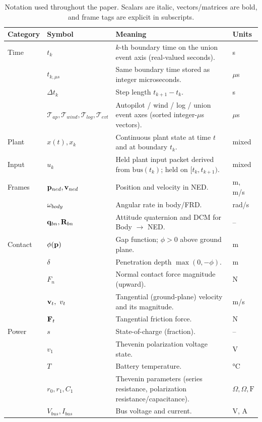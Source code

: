 \begin{table}[t]
  \centering
  \small
  \begin{tabularx}{\linewidth}{@{}l l X l@{}}
    \toprule
    Category & Symbol & Meaning & Units \\
    \midrule
    Time & $t_k$ & $k$-th boundary time on the union event axis (real-valued seconds). & s \\
         & $t_{k,\mu s}$ & Same boundary time stored as integer microseconds. & $\mu$s \\
         & $\Delta t_k$ & Step length $t_{k+1}-t_k$. & s \\
         & $\mathcal{T}_{ap},\mathcal{T}_{wind},\mathcal{T}_{log},\mathcal{T}_{evt}$ & Autopilot / wind / log / union event axes (sorted integer-$\mu$s vectors). & $\mu$s \\
    Plant & $x(t),x_k$ & Continuous plant state at time $t$ and at boundary $t_k$. & mixed \\
    Input & $u_k$ & Held plant input packet derived from $\mathrm{bus}(t_k)$; held on $[t_k,t_{k+1})$. & mixed \\
    Frames & $\mathbf{p}_{ned},\mathbf{v}_{ned}$ & Position and velocity in NED. & m, m/s \\
           & $\mathbf{\omega}_{body}$ & Angular rate in body/FRD. & rad/s \\
           & $\mathbf{q}_{bn},\mathbf{R}_{bn}$ & Attitude quaternion and DCM for Body $\to$ NED. & -- \\
    Contact & $\phi(\mathbf{p})$ & Gap function; $\phi>0$ above ground plane. & m \\
            & $\delta$ & Penetration depth $\max(0,-\phi)$. & m \\
            & $F_n$ & Normal contact force magnitude (upward). & N \\
            & $\vect{v}_t,\ v_t$ & Tangential (ground-plane) velocity and its magnitude. & m/s \\
            & $\mathbf{F}_t$ & Tangential friction force. & N \\
    Power & $s$ & State-of-charge (fraction). & -- \\
          & $v_1$ & Thevenin polarization voltage state. & V \\
          & $T$ & Battery temperature. & \si{\celsius} \\
          & $r_0,r_1,C_1$ & Thevenin parameters (series resistance, polarization resistance/capacitance). & $\Omega,\Omega,\mathrm{F}$ \\
          & $V_{bus},I_{bus}$ & Bus voltage and current. & V, A \\
    \bottomrule
  \end{tabularx}
  \caption{Notation used throughout the paper. Scalars are italic, vectors/matrices are bold, and frame tags are explicit in subscripts.}
  \label{tab:notation}
\end{table}


